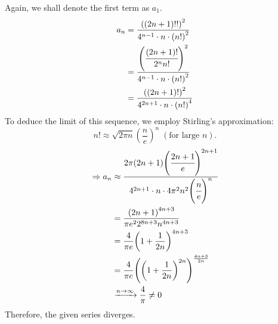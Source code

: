 \item

Again, we shall denote the first term as $a_1$.
\begin{align*}
	a_n
	&= \frac{{\left( (2n + 1)!! \right)}^2}{4^{n - 1} \cdot n \cdot {(n!)}^2} \\
	&= \cfrac{{\left( \cfrac{(2n + 1)!}{2^n n!} \right)}^2}{4^{n - 1} \cdot n \cdot {(n!)}^2} \\
	&= \frac{{\left( (2n + 1)! \right)}^2}{4^{2n + 1} \cdot n \cdot {(n!)}^4}
\end{align*}
To deduce the limit of this sequence, we employ Stirling's approximation:
\[
	n! \approx \sqrt{2\pi n} {\left( \frac{n}{e} \right)}^n \;(\text{for large $n$}).
\]
\begin{align*}
	\Rightarrow a_n
	&\approx \cfrac{
		2\pi (2n + 1) {\left( \cfrac{2n + 1}{e} \right)}^{2n + 1}
	}{
		4^{2n + 1} \cdot n \cdot 4\pi^2 n^2 {\left( \cfrac{n}{e} \right)}^n
	} \\
	&= \frac{
		{(2n + 1)}^{4n + 3}
	}{\pi e^2 2^{8n + 3} n^{4n + 3}} \\
	&= \frac{4}{\pi e} {\left( 1 + \frac{1}{2n} \right)}^{4n + 3} \\
	&= \frac{4}{\pi e} {\left( {\left( 1 + \frac{1}{2n} \right)}^{2n} \right)}^{\frac{4n + 3}{2n}} \\
	&\xrightarrow{n \rightarrow \infty} \frac{4}{\pi} \neq 0
\end{align*}
Therefore, the given series diverges.